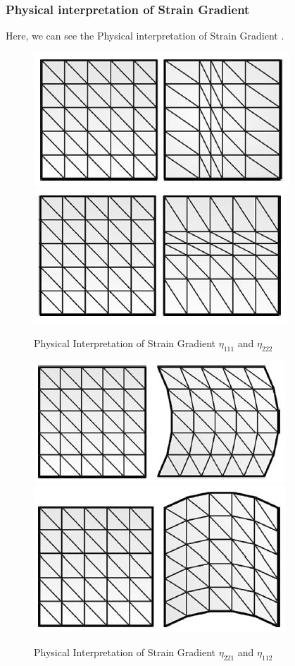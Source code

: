 \documentclass[12pt]{article}
\begin{document}
\subsubsection{ Physical interpretation of Strain Gradient}
Here, we can see the Physical interpretation of Strain Gradient \cite{lesivcar2017two}.
\begin{figure}[H]
	\begin{center}
		\includegraphics[scale=0.8]{U111_Eta_111.JPG}  \qquad \qquad
		\includegraphics[scale=0.8]{U222_Eta_222.JPG}
	\end{center}
   	\caption{Physical Interpretation of Strain Gradient $\eta_{111}$ and $\eta_{222}$ \cite{lesivcar2017two}}
\end{figure}
\begin{figure}[H]
	\begin{center}
		\includegraphics[scale=0.8]{U122_Eta_122.JPG}  \qquad \qquad
		\includegraphics[scale=0.8]{U211_Eta_211.JPG}
   	\caption{Physical Interpretation of Strain Gradient $\eta_{221}$ and $\eta_{112}$ \cite{lesivcar2017two}}		
	\end{center}  
\end{figure}
\end{document}
